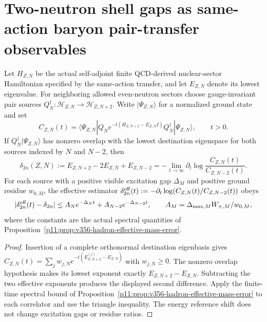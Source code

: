 \documentclass[12pt,a4paper]{article}
\begin{document}
\clearpage
\section{Two-neutron shell gaps as same-action baryon pair-transfer observables}
\label{p11:sec:v357-pair-shell-gap}
\begin{theorem}
\label{p11:thm:v357-pair-transfer-shell-gap}
Let $H_{Z,N}$ be the actual self-adjoint finite QCD-derived
nuclear-sector Hamiltonian specified by the same-action transfer,
and let $E_{Z,N}$ denote its lowest eigenvalue. For neighboring
allowed even-neutron sectors choose gauge-invariant pair sources
$Q_N^\dagger:\mathcal H_{Z,N}\to\mathcal H_{Z,N+2}$.
Write $|\Psi_{Z,N}\rangle$ for a normalized ground state and set
\[
 C_{Z,N}(t)=\langle\Psi_{Z,N}|
 Q_Ne^{-t(H_{Z,N+2}-E_{Z,N}I)}Q_N^\dagger
 |\Psi_{Z,N}\rangle,\qquad t>0.
\]
If $Q_N^\dagger|\Psi_{Z,N}\rangle$ has nonzero overlap with the
lowest destination eigenspace for both sources indexed by $N$ and
$N-2$, then
\[
 \boxed{\delta_{2n}(Z,N):=
 E_{Z,N+2}-2E_{Z,N}+E_{Z,N-2}
 =-\lim_{t\to\infty}\partial_t
 \log\frac{C_{Z,N}(t)}{C_{Z,N-2}(t)}.}
\]
For each source with a positive visible excitation gap $\Delta_M$
and positive ground residue $w_{0,M}$, the effective estimator
$\delta_{2n}^{\rm eff}(t):=-\partial_t\log
(C_{Z,N}(t)/C_{Z,N-2}(t))$ obeys
\[
 |\delta_{2n}^{\rm eff}(t)-\delta_{2n}|
 \le A_Ne^{-\Delta_Nt}+A_{N-2}e^{-\Delta_{N-2}t},\qquad
 A_M=\Delta_{\max,M}W_{+,M}/w_{0,M},
\]
where the constants are the actual spectral quantities of
Proposition~\ref{p11:prop:v356-hadron-effective-mass-error}.
\end{theorem}
\begin{proof}
Insertion of a complete orthonormal destination eigenbasis
gives $C_{Z,N}(t)=\sum_jw_{j,N}
 e^{-t(E^{(j)}_{Z,N+2}-E_{Z,N})}$ with $w_{j,N}\ge0$.
The nonzero overlap hypothesis makes its lowest exponent exactly
$E_{Z,N+2}-E_{Z,N}$. Subtracting the two effective exponents
produces the displayed second difference. Apply the finite-time
spectral bound of Proposition~\ref{p11:prop:v356-hadron-effective-mass-error}
to each correlator and use the triangle inequality. The energy
reference shift does not change excitation gaps or residue ratios.
\end{proof}
\end{document}
